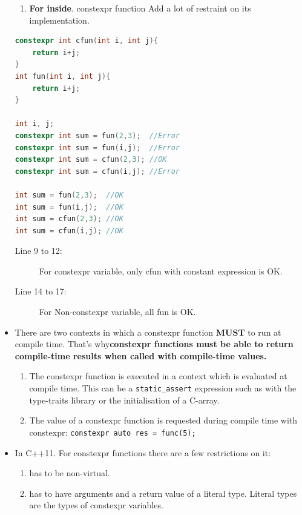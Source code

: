 \documentclass[a4paper,11pt,twoside]{book}
\begin{document}
\begin{itemize}
\begin{enumerate}
		\item \textbf{For inside}. constexpr function Add a lot of restraint on its implementation.


	\end{enumerate}
	
\begin{lstlisting}[frame=single, language=c++]
constexpr int cfun(int i, int j){
	return i+j;
}
int fun(int i, int j){
	return i+j;
}
	
int i, j;
constexpr int sum = fun(2,3);  //Error
constexpr int sum = fun(i,j);  //Error
constexpr int sum = cfun(2,3); //OK
constexpr int sum = cfun(i,j); //Error

int sum = fun(2,3);  //OK
int sum = fun(i,j);  //OK
int sum = cfun(2,3); //OK
int sum = cfun(i,j); //OK
\end{lstlisting}

\begin{description}
	\item[Line 9 to 12:] For constexpr variable, only cfun with constant expression is OK.
	\item[Line 14 to 17:] For Non-constexpr variable, all fun is OK.
\end{description}
	
	\item There are two contexts in which a constexpr function \textbf{MUST} to run at compile time. That's why\textbf{constexpr functions must be able to return compile-time results when called with compile-time values.}
	\begin{enumerate}
		\item The constexpr function is executed in a context which is evaluated at compile time. This can be a \texttt{static\_assert} expression such as with the type-traits library or the initialisation of a C-array.
		
		\item The value of a constexpr function is requested during compile time with constexpr: \texttt{constexpr auto res = func(5);}
	\end{enumerate}
	
	\item In C++11. For constexpr functions there are a few restrictions on it:
	\begin{enumerate}
		\item has to be non-virtual.
		
		\item has to have arguments and a return value of a literal type. Literal types are the types of constexpr variables.
		

\end{enumerate}
\end{itemize}
\end{document}

